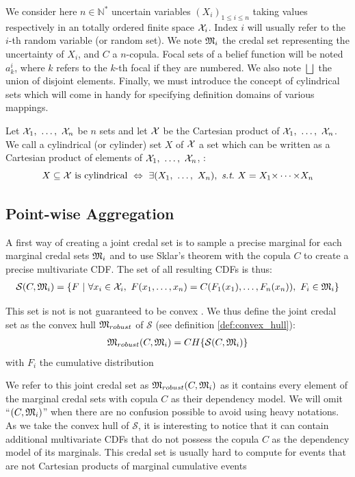 We consider here $n\in\mathbb{N}^*$ uncertain variables $(X_i)_{1\leqslant i\leqslant n}$ taking values respectively in an totally ordered finite space ${\mathcal{X}}_i$. Index $i$ will usually refer to the $i$-th random variable (or random set). We note ${\mathfrak{M}}_i$ the credal set representing the uncertainty of $X_i$, and $C$ a $n$-copula. Focal sets of a belief function will be noted $a^i_k$, where $k$ refers to the $k$-th focal if they are numbered. We also note $\bigsqcup$ the union of disjoint elements. Finally, we must introduce the concept of cylindrical sets which will come in handy for specifying definition domains of various mappings. 
\begin{definition}
    Let ${\mathcal{X}}_1,~\dots,~{\mathcal{X}}_n$ be $n$ sets and let ${\mathcal{X}}$ be the Cartesian product of ${\mathcal{X}}_1,~\dots,~{\mathcal{X}}_n$. We call a cylindrical (or cylinder) set $X$ of ${\mathcal{X}}$ a set which can be written as a Cartesian product of elements of ${\mathcal{X}}_1,~\dots,~{\mathcal{X}}_n$, \ie:
    \begin{equation}
        X\subseteq\X \text{ is cylindrical} ~\Leftrightarrow~ \exists (X_1,~\dots,~X_n),~\st~X=X_1\tdt X_n \label{eq:cylindrical_sets}
    \end{equation}
\end{definition}

\subsection{Point-wise Aggregation}\label{sec:robust_method}
A first way of creating a joint credal set is to sample a precise marginal for each marginal credal sets ${\mathfrak{M}}_i$ and to use Sklar's theorem with the copula $C$ to create a precise multivariate CDF. The set of all resulting CDFs is thus:
\begin{eqnarray}\label{eq:robust_ancestor}
    \mathcal{S}(C,{\mathfrak{M}}_i) = \{F~|~\forall x_i \in {\mathcal{X}}_i,~ F(x_1,\dots,x_n) = C(F_1(x_1), \dots, F_n(x_n)),~F_i\in{\mathfrak{M}}_i \}
\end{eqnarray}

This set is not is not guaranteed to be convex \cite{schmelzer_random_2023}. We thus define the joint credal set as the convex hull ${\mathfrak{M}}_{robust}$ of $\mathcal{S}$ (see definition \ref{def:convex_hull}):
\begin{eqnarray}\label{eq:robust_set}
    {\mathfrak{M}}_{robust}(C,{\mathfrak{M}}_i) = CH\{\mathcal{S}(C,{\mathfrak{M}}_i)\}
\end{eqnarray}
with $F_i$ the cumulative distribution

We refer to this joint credal set as ${\mathfrak{M}}_{robust}(C,{\mathfrak{M}}_i)$ as it contains every element of the marginal credal sets with copula $C$ as their dependency model. We will omit ``$(C,{\mathfrak{M}}_i)$'' when there are no confusion possible to avoid using heavy notations. As we take the convex hull of $\mathcal{S}$, it is interesting to notice that it can contain additional multivariate CDFs that do not possess the copula $C$ as the dependency model of its marginals. This credal set is usually hard to compute for events that are not Cartesian products of marginal cumulative events

